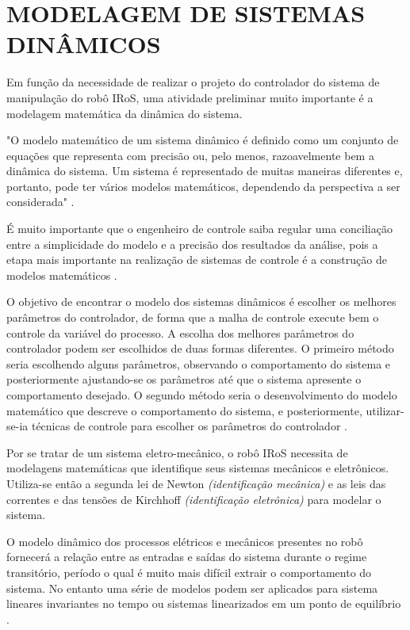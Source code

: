 \documentclass[12pt,oneside,a4paper, chapter=TITLE, section = TITLE, english, brazil]{abntex2}
\begin{document}

\chapter{MODELAGEM DE SISTEMAS DINÂMICOS} %

Em função da necessidade de realizar o projeto do controlador do sistema de manipulação do robô IRoS, uma atividade preliminar muito importante é a modelagem matemática da dinâmica do sistema.

\begin{citacao}
"O modelo matemático de um sistema dinâmico é definido como um conjunto de equações que representa com precisão ou, pelo menos,  razoavelmente bem a dinâmica do sistema. Um sistema é representado de muitas maneiras diferentes e, portanto, pode ter vários modelos matemáticos, dependendo da perspectiva a ser considerada" \cite{ogata}.
\end{citacao}

É muito importante que o engenheiro de controle saiba regular uma conciliação entre a simplicidade do modelo e a precisão dos resultados da análise, pois a etapa mais importante na realização de sistemas de controle é a construção de modelos matemáticos \cite{ogata}.

O objetivo de encontrar o modelo dos sistemas dinâmicos é escolher os melhores parâmetros do controlador, de forma que a malha de controle execute bem o controle da variável do processo. A escolha dos melhores parâmetros do controlador podem ser escolhidos de duas formas diferentes. O primeiro método seria escolhendo alguns parâmetros, observando o comportamento do sistema e posteriormente ajustando-se os parâmetros até que o sistema apresente o comportamento desejado. O segundo método seria o desenvolvimento do modelo matemático que descreve o comportamento do sistema, e posteriormente, utilizar-se-ia técnicas de controle para escolher os parâmetros do controlador \cite{astrom}.

Por se tratar de um sistema eletro-mecânico, o robô IRoS necessita de modelagens matemáticas que identifique seus sistemas mecânicos e eletrônicos. Utiliza-se então a segunda lei de Newton \textit{(identificação mecânica)} e as leis das correntes e das tensões de Kirchhoff \textit{(identificação eletrônica)} para modelar o sistema.

O modelo dinâmico dos processos elétricos e mecânicos presentes no robô fornecerá a relação entre as entradas e saídas do sistema durante o regime transitório, período o qual é muito mais difícil extrair o comportamento do sistema. No entanto uma série de modelos podem ser aplicados para sistema lineares invariantes no tempo ou sistemas linearizados em um ponto de equilíbrio \cite{astrom}.
\end{document}
